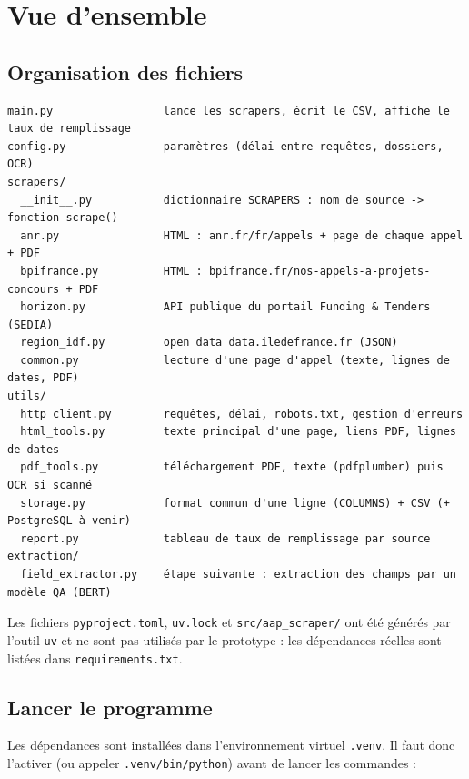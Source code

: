 \documentclass[11pt,a4paper]{article}
\newcommand{\code}[1]{\texttt{#1}}
\begin{document}
\section{Vue d'ensemble}

\subsection{Organisation des fichiers}

\begin{lstlisting}[language={},basicstyle=\ttfamily\scriptsize]
main.py                 lance les scrapers, écrit le CSV, affiche le taux de remplissage
config.py               paramètres (délai entre requêtes, dossiers, OCR)
scrapers/
  __init__.py           dictionnaire SCRAPERS : nom de source -> fonction scrape()
  anr.py                HTML : anr.fr/fr/appels + page de chaque appel + PDF
  bpifrance.py          HTML : bpifrance.fr/nos-appels-a-projets-concours + PDF
  horizon.py            API publique du portail Funding & Tenders (SEDIA)
  region_idf.py         open data data.iledefrance.fr (JSON)
  common.py             lecture d'une page d'appel (texte, lignes de dates, PDF)
utils/
  http_client.py        requêtes, délai, robots.txt, gestion d'erreurs
  html_tools.py         texte principal d'une page, liens PDF, lignes de dates
  pdf_tools.py          téléchargement PDF, texte (pdfplumber) puis OCR si scanné
  storage.py            format commun d'une ligne (COLUMNS) + CSV (+ PostgreSQL à venir)
  report.py             tableau de taux de remplissage par source
extraction/
  field_extractor.py    étape suivante : extraction des champs par un modèle QA (BERT)
\end{lstlisting}

Les fichiers \code{pyproject.toml}, \code{uv.lock} et \code{src/aap\_scraper/} ont été
générés par l'outil \code{uv} et ne sont pas utilisés par le prototype : les dépendances
réelles sont listées dans \code{requirements.txt}.

\subsection{Lancer le programme}

Les dépendances sont installées dans l'environnement virtuel \code{.venv}. Il faut donc
l'activer (ou appeler \code{.venv/bin/python}) avant de lancer les commandes :
\end{document}
